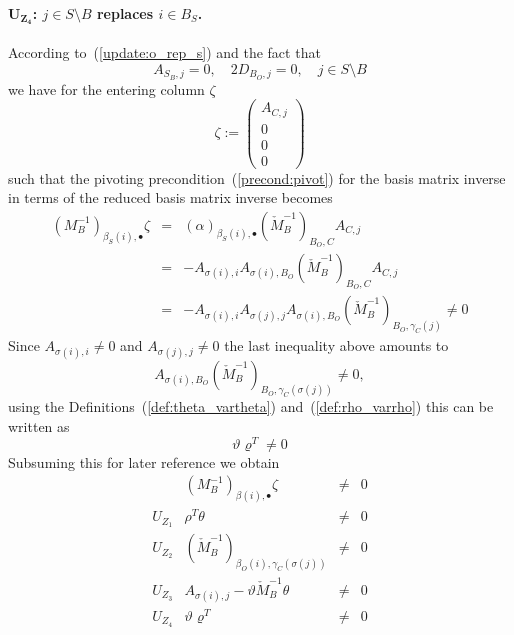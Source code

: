 \documentclass[a4paper]{article}
\begin{document}
\paragraph{$\mathbf{U_{Z_{4}}}$: $j \in S \setminus B$ replaces $i \in B_{S}$.}
According to~(\ref{update:o_rep_s})
and the fact that
\begin{equation}
A_{S_{B},j}=0, \quad 2D_{B_{O}, j}=0, \quad j \in S \setminus B
\end{equation}
we have for the entering column $\zeta$
\begin{equation}
\zeta:=
\left(
\begin{array}{c}
A_{C, j} \\
\hline
0 \\
\hline
0 \\
\hline
0
\end{array}
\right)
\end{equation}
such that the pivoting precondition~(\ref{precond:pivot})
for the basis matrix inverse in terms of
the reduced basis matrix inverse becomes
\begin{eqnarray}
\left(M_{B}^{-1}\right)_{\beta_{S}(i), \bullet} \zeta
&=&
\left(\alpha\right)_{\beta_{S}(i), \bullet}
\left(\check{M}_{B}^{-1}\right)_{B_{O},C}A_{C,j}
\nonumber \\
&=&
-A_{\sigma(i),i}A_{\sigma(i),B_{O}}
 \left(\check{M}_{B}^{-1}\right)_{B_{O},C}A_{C,j}
\nonumber \\
&=&
-A_{\sigma(i),i}A_{\sigma(j),j}A_{\sigma(i),B_{O}}
 \left(\check{M}_{B}^{-1}\right)_{B_{O},\gamma_{C}(j)}
 \neq 0
 \nonumber
\end{eqnarray}
Since $A_{\sigma(i), i} \neq 0$ and $A_{\sigma(j),j} \neq 0$
the last inequality above amounts to
\begin{equation}
A_{\sigma(i),B_{O}}
\left(\check{M}_{B}^{-1}\right)_{B_{O},\gamma_{C}(\sigma(j))}
\neq 0,
\nonumber
\end{equation}
using the Definitions~(\ref{def:theta_vartheta})
and~(\ref{def:rho_varrho}) this can be written as
\begin{equation}
\vartheta \varrho^{T} \neq 0
\end{equation}
Subsuming this for later reference we obtain
\begin{equation}
\label{table:pivot_precond}
\begin{array}{c|ccc}
&
\left(M_{B}^{-1}\right)_{\beta(i), \bullet} \zeta
&\neq& 0
 \\
\hline
U_{Z_{1}} 
&
\rho^{T} \theta &\neq& 0
 \\
U_{Z_{2}}
&
\left(\check{M}_{B}^{-1}\right)_{\beta_{O}(i), \gamma_{C}(\sigma(j))}
&\neq& 0
 \\
U_{Z_{3}}
&
A_{\sigma(i), j}
-\vartheta\check{M}_{B}^{-1}\theta
&\neq& 0
 \\
U_{Z_{4}}
&
\vartheta \varrho^{T} &\neq& 0
\end{array}
\end{equation}
\end{document}
